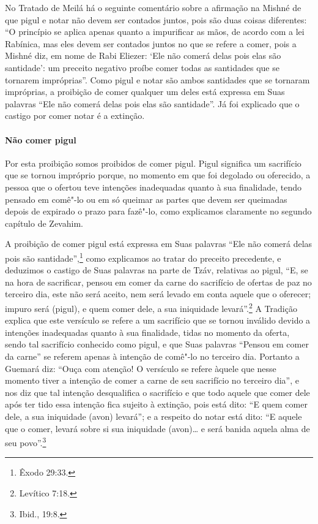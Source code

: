 \begin{multicols}{2}
No Tratado de Meilá\starr{} há o seguinte comentário sobre a afirmação na Mishné
de que pigul\starr{} e notar\starr{} não devem ser contados juntos, pois são
duas coisas diferentes: ``O princípio se aplica apenas quanto a
impurificar as mãos, de acordo com a lei Rabínica, mas eles devem ser
contados juntos no que se refere a comer, pois a Mishné diz, em nome de
Rabi Eliezer\starr: `Ele não comerá delas pois elas são santidade': um
preceito negativo proíbe comer todas as santidades que se tornarem
impróprias''. Como pigul\starr{} e notar\starr{} são ambos santidades que se
tornaram impróprias, a proibição de comer qualquer um deles está
expressa em Suas palavras ``Ele não comerá delas pois elas são
santidade''. Já foi explicado que o castigo por comer notar\starr{} é a
extinção.

\paragraph{Não comer pigul\starr{}}

Por esta proibição somos proibidos de comer pigul\starr. Pigul\starr{}
significa um sacrifício que se tornou impróprio porque, no momento em
que foi degolado ou oferecido, a pessoa que o ofertou teve intenções
inadequadas quanto à sua finalidade, tendo pensado em comê"-lo ou em só
queimar as partes que devem ser queimadas depois de expirado o prazo
para fazê"-lo, como explicamos claramente no segundo capítulo de
Zevahim\starr.

A proibição de comer pigul\starr{} está expressa em Suas palavras ``Ele não
comerá delas pois são santidade'',\footnote{Êxodo 29:33.} como explicamos ao
tratar do preceito precedente, e deduzimos o castigo de Suas palavras
na parte de Tzáv\starr, relativas ao pigul\starr, ``E, se na hora de sacrificar,
pensou em comer da carne do sacrifício de ofertas de paz no terceiro
dia, este não será aceito, nem será levado em conta aquele que o
oferecer; impuro será (pigul\starr), e quem comer dele, a sua iniquidade
levará''.\footnote{Levítico 7:18.} A Tradição explica que este versículo se
refere a um sacrifício que se tornou inválido devido a intenções
inadequadas quanto à sua finalidade, tidas no momento da oferta, sendo
tal sacrifício conhecido como pigul\starr, e que Suas palavras ``Pensou em
comer da carne'' se referem apenas à intenção de comê"-lo no terceiro
dia. Portanto a Guemará\starr{} diz: ``Ouça com atenção! O versículo se refere
àquele que nesse momento tiver a intenção de comer a carne de seu
sacrifício no terceiro dia'', e nos diz que tal intenção desqualifica o
sacrifício e que todo aquele que comer dele após ter tido essa intenção
fica sujeito à extinção, pois está dito: ``E quem comer dele, a sua
iniquidade (avon\starr) levará''; e a respeito do notar\starr{} está dito: ``E
aquele que o comer, levará sobre si sua iniquidade (avon\starr)\ldots{} e será
banida aquela alma de seu povo''.\footnote{Ibid., 19:8.}


\end{multicols}
